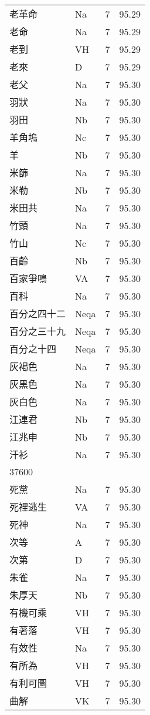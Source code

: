 \documentclass[twocolumn]{book}
\begin{document}
\begin{supertabular}{llrr}
老革命 & Na & 7 &  95.29\\
老命 & Na & 7 &  95.29\\
老到 & VH & 7 &  95.29\\
老來 & D & 7 &  95.29\\
老父 & Na & 7 &  95.30\\
羽狀 & Na & 7 &  95.30\\
羽田 & Nb & 7 &  95.30\\
羊角塢 & Nc & 7 &  95.30\\
羊 & Nb & 7 &  95.30\\
米篩 & Na & 7 &  95.30\\
米勒 & Nb & 7 &  95.30\\
米田共 & Na & 7 &  95.30\\
竹頭 & Na & 7 &  95.30\\
竹山 & Nc & 7 &  95.30\\
百齡 & Nb & 7 &  95.30\\
百家爭鳴 & VA & 7 &  95.30\\
百科 & Na & 7 &  95.30\\
百分之四十二 & Neqa & 7 &  95.30\\
百分之三十九 & Neqa & 7 &  95.30\\
百分之十四 & Neqa & 7 &  95.30\\
灰褐色 & Na & 7 &  95.30\\
灰黑色 & Na & 7 &  95.30\\
灰白色 & Na & 7 &  95.30\\
江連君 & Nb & 7 &  95.30\\
江兆申 & Nb & 7 &  95.30\\
汗衫 & Na & 7 &  95.30\\
37600\\
死黨 & Na & 7 &  95.30\\
死裡逃生 & VA & 7 &  95.30\\
死神 & Na & 7 &  95.30\\
次等 & A & 7 &  95.30\\
次第 & D & 7 &  95.30\\
朱雀 & Na & 7 &  95.30\\
朱厚天 & Nb & 7 &  95.30\\
有機可乘 & VH & 7 &  95.30\\
有著落 & VH & 7 &  95.30\\
有效性 & Na & 7 &  95.30\\
有所為 & VH & 7 &  95.30\\
有利可圖 & VH & 7 &  95.30\\
曲解 & VK & 7 &  95.30\\

\end{supertabular}
\end{document}

